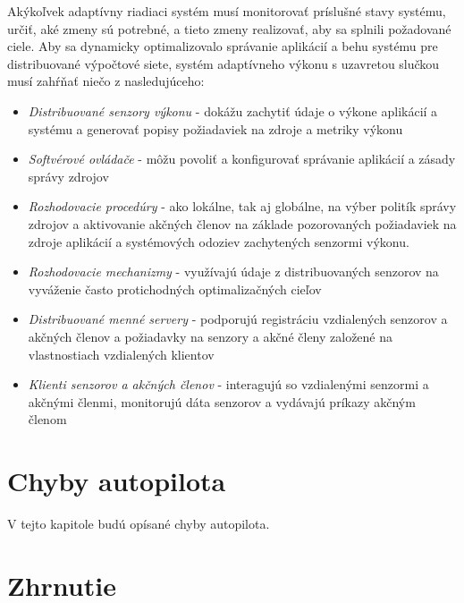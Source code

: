 \documentclass[10pt,twoside,slovak,a4paper]{article}
\begin{document}
Akýkoľvek adaptívny riadiaci systém musí monitorovať príslušné stavy systému, určiť, aké zmeny sú potrebné, a tieto zmeny realizovať, aby sa splnili požadované ciele. Aby sa dynamicky optimalizovalo správanie aplikácií a behu systému pre distribuované výpočtové siete, systém adaptívneho výkonu s uzavretou slučkou musí zahŕňať
niečo z nasledujúceho:

\begin{itemize}
\item \emph{Distribuované senzory výkonu} - dokážu zachytiť údaje o výkone aplikácií a systému a generovať popisy požiadaviek na zdroje a metriky výkonu
\item \emph{Softvérové ovládače} - môžu povoliť a konfigurovať správanie aplikácií a zásady správy zdrojov
\item \emph{Rozhodovacie procedúry} - ako lokálne, tak aj globálne, na výber politík správy zdrojov a aktivovanie akčných členov na základe pozorovaných požiadaviek na zdroje aplikácií a systémových odoziev zachytených senzormi výkonu.
\item \emph{Rozhodovacie mechanizmy} - využívajú údaje z distribuovaných senzorov na vyváženie často protichodných optimalizačných cieľov
\item \emph{Distribuované menné servery} - podporujú registráciu vzdialených senzorov a akčných členov a požiadavky na senzory a akčné členy založené na vlastnostiach vzdialených klientov
\item \emph{Klienti senzorov a akčných členov} - interagujú so vzdialenými senzormi a akčnými členmi, monitorujú dáta senzorov a vydávajú príkazy akčným členom \cite{SoftverAutopilot}
\end{itemize}

\section{Chyby autopilota} \label{chyby}

V tejto kapitole budú opísané chyby autopilota.

\section{Zhrnutie}


 
\end{document}
